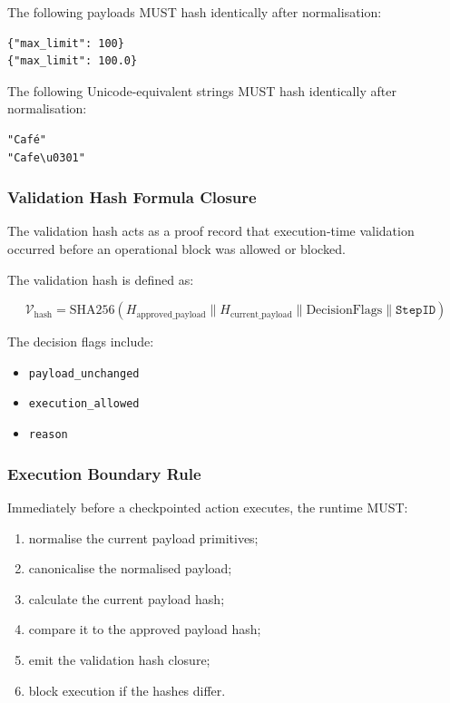 The following payloads MUST hash identically after normalisation:

\begin{verbatim}
{"max_limit": 100}
{"max_limit": 100.0}
\end{verbatim}

The following Unicode-equivalent strings MUST hash identically after normalisation:

\begin{verbatim}
"Café"
"Cafe\u0301"
\end{verbatim}

\subsubsection{Validation Hash Formula Closure}

The validation hash acts as a proof record that execution-time validation occurred before an operational block was allowed or blocked.

The validation hash is defined as:

\begin{equation}
\mathcal{V}_{\mathrm{hash}}
=
\mathrm{SHA256}
(
H_{\mathrm{approved\_payload}}
\parallel
H_{\mathrm{current\_payload}}
\parallel
\mathrm{DecisionFlags}
\parallel
\texttt{StepID}
)
\end{equation}

The decision flags include:

\begin{itemize}
  \item \texttt{payload\_unchanged}
  \item \texttt{execution\_allowed}
  \item \texttt{reason}
\end{itemize}

\subsubsection{Execution Boundary Rule}

Immediately before a checkpointed action executes, the runtime MUST:

\begin{enumerate}
  \item normalise the current payload primitives;
  \item canonicalise the normalised payload;
  \item calculate the current payload hash;
  \item compare it to the approved payload hash;
  \item emit the validation hash closure;
  \item block execution if the hashes differ.
\end{enumerate}

